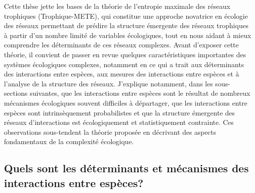 Cette thèse jette les bases de la théorie de l'entropie maximale des réseaux
trophiques (Trophique-METE), qui constitue une approche novatrice en écologie
des réseaux permettant de prédire la structure émergente des réseaux trophiques
à partir d'un nombre limité de variables écologiques, tout en nous aidant à
mieux comprendre les déterminants de ces réseaux complexes. Avant d'exposer
cette théorie, il convient de passer en revue quelques caractéristiques
importantes des systèmes écologiques complexes, notamment en ce qui a trait aux
déterminants des interactions entre espèces, aux mesures des
interactions entre espèces et à l'analyse de la structure des réseaux.
J'explique notamment, dans les sous-sections suivantes, que les interactions
entre espèces sont le résultat de nombreux mécanismes écologiques souvent
difficiles à départager, que les interactions entre espèces sont intrinsèquement
probabilistes et que la structure émergente des réseaux d'interactions est
écologiquement et statistiquement contrainte. Ces observations sous-tendent la
théorie proposée en décrivant des aspects fondamentaux de la complexité
écologique.

\subsection{Quels sont les déterminants et mécanismes des interactions entre espèces?} 

